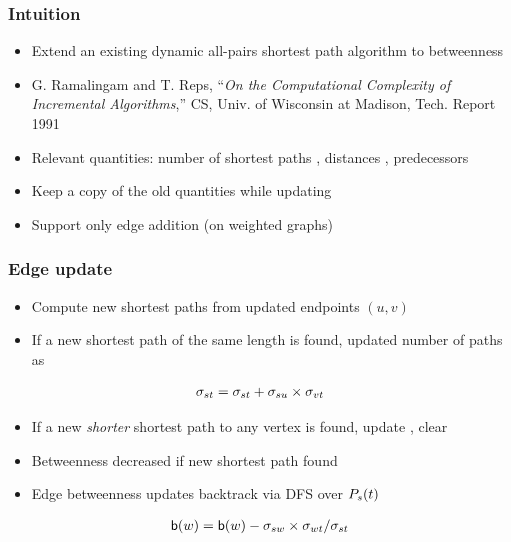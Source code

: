 \begin{frame}
  \frametitle{Intuition}

  \begin{itemize}
    \item Extend an existing dynamic all-pairs shortest path algorithm to betweenness
    \item G. Ramalingam and T. Reps, ``\emph{On the Computational Complexity of Incremental Algorithms},'' CS, Univ. of Wisconsin at Madison, Tech. Report 1991
    \item Relevant quantities: number of shortest paths \paths, distances \dist, predecessors \pred
    \item Keep a copy of the old quantities while updating
    \item Support only edge addition (on weighted graphs)
  \end{itemize}

\end{frame}


\begin{frame}
  \frametitle{Edge update}

  \begin{itemize}
    \item Compute new shortest paths from updated endpoints $(u,v)$
    \item If a new shortest path of the same length is found, updated number of paths as
  \end{itemize}
  {\Large
    \begin{align*}
      \sigma_{st} = \sigma_{st} + \sigma_{su} \times \sigma_{vt}
    \end{align*}
  }
  \begin{itemize}
    \item If a new \emph{shorter} shortest path to any vertex is found, update \dist, clear \paths
    \item Betweenness decreased if new shortest path found
    \item Edge betweenness updates backtrack via DFS over $P_s(t)$
  \end{itemize}
  {\Large
    \begin{align*}
      \mathsf{b}(w) = \mathsf{b}(w) - \sigma_{sw} \times \sigma_{wt} / \sigma_{st}
    \end{align*}
  }
\end{frame}



